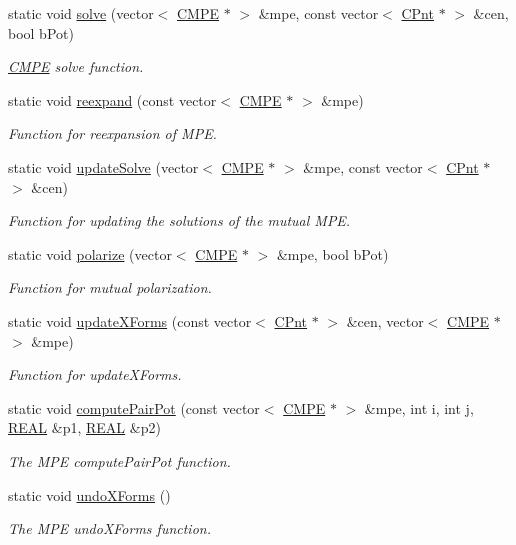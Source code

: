 \begin{DoxyCompactItemize}
static void \hyperlink{classCMPE_a46bad2726842ca10071fd004010a6e1b}{solve} (vector$<$ \hyperlink{classCMPE}{C\-M\-P\-E} $\ast$ $>$ \&mpe, const vector$<$ \hyperlink{classCPnt}{C\-Pnt} $\ast$ $>$ \&cen, bool b\-Pot)
\begin{DoxyCompactList}\small\item\em \hyperlink{classCMPE}{C\-M\-P\-E} solve function. \end{DoxyCompactList}\item 
static void \hyperlink{classCMPE_af10ee159904becb5add924aa48df3c56}{reexpand} (const vector$<$ \hyperlink{classCMPE}{C\-M\-P\-E} $\ast$ $>$ \&mpe)
\begin{DoxyCompactList}\small\item\em Function for reexpansion of M\-P\-E. \end{DoxyCompactList}\item 
static void \hyperlink{classCMPE_a70e20d2a606e1bae88c117b15a511e17}{update\-Solve} (vector$<$ \hyperlink{classCMPE}{C\-M\-P\-E} $\ast$ $>$ \&mpe, const vector$<$ \hyperlink{classCPnt}{C\-Pnt} $\ast$ $>$ \&cen)
\begin{DoxyCompactList}\small\item\em Function for updating the solutions of the mutual M\-P\-E. \end{DoxyCompactList}\item 
static void \hyperlink{classCMPE_ab6f4e1fc5fe634c04841e691903d8029}{polarize} (vector$<$ \hyperlink{classCMPE}{C\-M\-P\-E} $\ast$ $>$ \&mpe, bool b\-Pot)
\begin{DoxyCompactList}\small\item\em Function for mutual polarization. \end{DoxyCompactList}\item 
static void \hyperlink{classCMPE_a65d2f19a87b451dbd84bb4b11cbfd571}{update\-X\-Forms} (const vector$<$ \hyperlink{classCPnt}{C\-Pnt} $\ast$ $>$ \&cen, vector$<$ \hyperlink{classCMPE}{C\-M\-P\-E} $\ast$ $>$ \&mpe)
\begin{DoxyCompactList}\small\item\em Function for update\-X\-Forms. \end{DoxyCompactList}\item 
static void \hyperlink{classCMPE_ab494bf000a7dec9410d23a5f47204baf}{compute\-Pair\-Pot} (const vector$<$ \hyperlink{classCMPE}{C\-M\-P\-E} $\ast$ $>$ \&mpe, int i, int j, \hyperlink{util_8h_a5821460e95a0800cf9f24c38915cbbde}{R\-E\-A\-L} \&p1, \hyperlink{util_8h_a5821460e95a0800cf9f24c38915cbbde}{R\-E\-A\-L} \&p2)
\begin{DoxyCompactList}\small\item\em The M\-P\-E compute\-Pair\-Pot function. \end{DoxyCompactList}\item 
static void \hyperlink{classCMPE_a61688da6057b840ca71dacb47db0c0ac}{undo\-X\-Forms} ()
\begin{DoxyCompactList}\small\item\em The M\-P\-E undo\-X\-Forms function. \end{DoxyCompactList}\end{DoxyCompactItemize}

